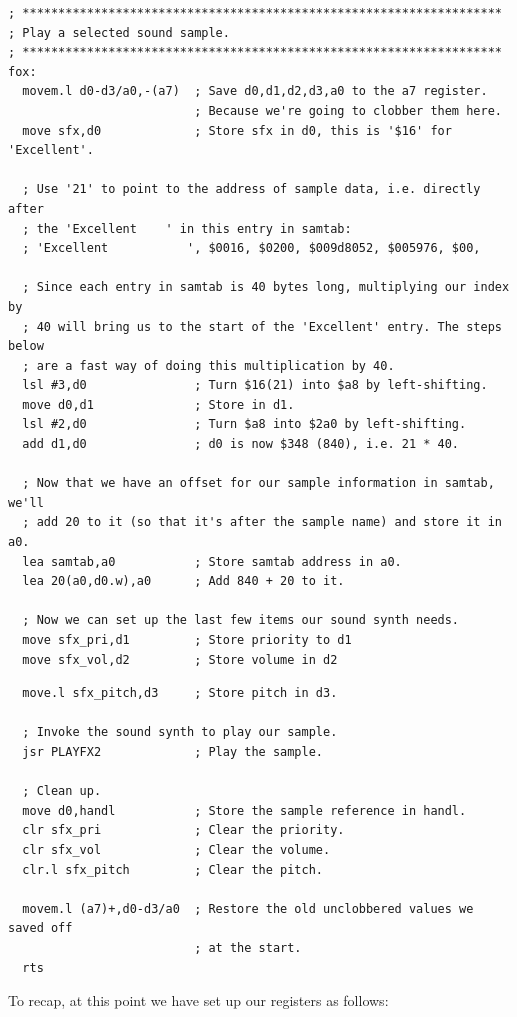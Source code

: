 \begin{lstlisting}
; *******************************************************************
; Play a selected sound sample.
; *******************************************************************
fox:
  movem.l d0-d3/a0,-(a7)  ; Save d0,d1,d2,d3,a0 to the a7 register.
                          ; Because we're going to clobber them here.
  move sfx,d0             ; Store sfx in d0, this is '$16' for 'Excellent'.

  ; Use '21' to point to the address of sample data, i.e. directly after
  ; the 'Excellent    ' in this entry in samtab:
  ; 'Excellent           ', $0016, $0200, $009d8052, $005976, $00, 

  ; Since each entry in samtab is 40 bytes long, multiplying our index by
  ; 40 will bring us to the start of the 'Excellent' entry. The steps below
  ; are a fast way of doing this multiplication by 40.
  lsl #3,d0               ; Turn $16(21) into $a8 by left-shifting. 
  move d0,d1              ; Store in d1.
  lsl #2,d0               ; Turn $a8 into $2a0 by left-shifting.           
  add d1,d0               ; d0 is now $348 (840), i.e. 21 * 40. 

  ; Now that we have an offset for our sample information in samtab, we'll
  ; add 20 to it (so that it's after the sample name) and store it in a0.
  lea samtab,a0           ; Store samtab address in a0.
  lea 20(a0,d0.w),a0      ; Add 840 + 20 to it. 

  ; Now we can set up the last few items our sound synth needs.
  move sfx_pri,d1         ; Store priority to d1
  move sfx_vol,d2         ; Store volume in d2
\end{lstlisting}
\begin{lstlisting}
  move.l sfx_pitch,d3     ; Store pitch in d3.

  ; Invoke the sound synth to play our sample.
  jsr PLAYFX2             ; Play the sample.

  ; Clean up.
  move d0,handl           ; Store the sample reference in handl.
  clr sfx_pri             ; Clear the priority.
  clr sfx_vol             ; Clear the volume.
  clr.l sfx_pitch         ; Clear the pitch.

  movem.l (a7)+,d0-d3/a0  ; Restore the old unclobbered values we saved off
                          ; at the start.
  rts
\end{lstlisting}

To recap, at this point we have set up our registers as follows:

